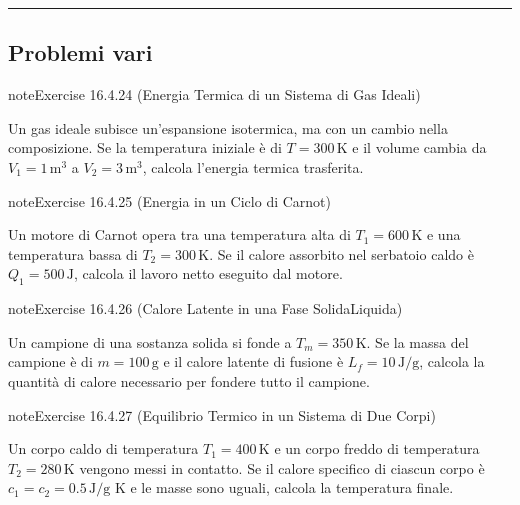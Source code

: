 \documentclass[letterpaper,10pt,italian]{jupyterBook}
\begin{document}
\bigskip\hrule\bigskip



\subsection{Problemi vari}
\label{\detokenize{ch/thermodynamics/matter-problems:problemi-vari}} \label{exercise:ch/thermodynamics/matter-problems-exercise-23}

\begin{sphinxadmonition}{note}{Exercise 16.4.24 (Energia Termica di un Sistema di Gas Ideali)}



\sphinxAtStartPar
Un gas ideale subisce un’espansione isotermica, ma con un cambio nella composizione. Se la temperatura iniziale è di \(T = 300 \, \text{K}\) e il volume cambia da \(V_1 = 1 \, \text{m}^3\) a \(V_2 = 3 \, \text{m}^3\), calcola l’energia termica trasferita.
\end{sphinxadmonition}
 \label{exercise:ch/thermodynamics/matter-problems-exercise-24}

\begin{sphinxadmonition}{note}{Exercise 16.4.25 (Energia in un Ciclo di Carnot)}



\sphinxAtStartPar
Un motore di Carnot opera tra una temperatura alta di \(T_1 = 600 \, \text{K}\) e una temperatura bassa di \(T_2 = 300 \, \text{K}\). Se il calore assorbito nel serbatoio caldo è \(Q_1 = 500 \, \text{J}\), calcola il lavoro netto eseguito dal motore.
\end{sphinxadmonition}
 \label{exercise:ch/thermodynamics/matter-problems-exercise-25}

\begin{sphinxadmonition}{note}{Exercise 16.4.26 (Calore Latente in una Fase Solida\sphinxhyphen{}Liquida)}



\sphinxAtStartPar
Un campione di una sostanza solida si fonde a \(T_m = 350 \, \text{K}\). Se la massa del campione è di \(m = 100 \, \text{g}\) e il calore latente di fusione è \(L_f = 10 \, \text{J/g}\), calcola la quantità di calore necessario per fondere tutto il campione.
\end{sphinxadmonition}
 \label{exercise:ch/thermodynamics/matter-problems-exercise-26}

\begin{sphinxadmonition}{note}{Exercise 16.4.27 (Equilibrio Termico in un Sistema di Due Corpi)}



\sphinxAtStartPar
Un corpo caldo di temperatura \(T_1 = 400 \, \text{K}\) e un corpo freddo di temperatura \(T_2 = 280 \, \text{K}\) vengono messi in contatto. Se il calore specifico di ciascun corpo è \(c_1 = c_2 = 0.5 \, \text{J/g K}\) e le masse sono uguali, calcola la temperatura finale.
\end{sphinxadmonition}
 \label{exercise:ch/thermodynamics/matter-problems-exercise-27}
\end{document}
